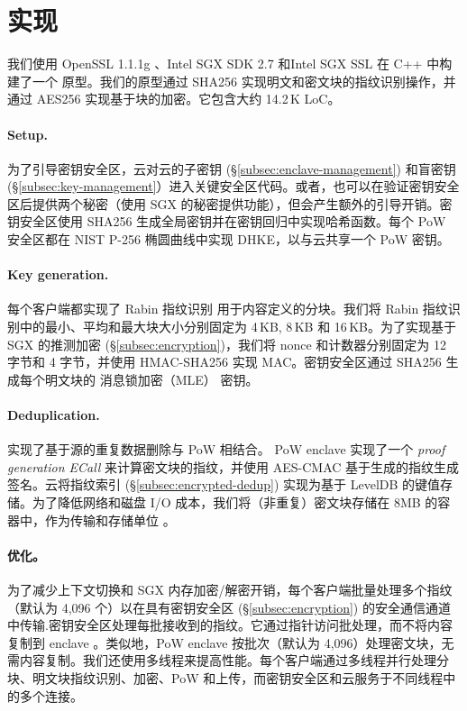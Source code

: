 \section{实现}
\label{sec:implementation}

我们使用 OpenSSL 1.1.1g \cite{openssl}、Intel SGX SDK 2.7 \cite{sgx} 和Intel SGX SSL \cite{sgxssl} 在 C++ 中构建了一个 \sysnameS 原型。我们的原型通过 SHA256 实现明文和密文块的指纹识别操作，并通过 AES256 实现基于块的加密。它包含大约 14.2\,K LoC。

\paragraph{Setup.} 
为了引导密钥安全区，云对云的子密钥 (\S\ref{subsec:enclave-management}) 和盲密钥 (\S\ref{subsec:key-management}）进入关键安全区代码。或者，\sysnameS 也可以在验证密钥安全区后提供两个秘密（使用 SGX \cite{sgx} 的秘密提供功能），但会产生额外的引导开销。密钥安全区使用 SHA256 生成全局密钥并在密钥回归中实现哈希函数。每个 PoW 安全区都在 NIST P-256 椭圆曲线中实现 DHKE，以与云共享一个 PoW 密钥。

\paragraph{Key generation.} 每个客户端都实现了 Rabin 指纹识别 \cite{rabin81} 用于内容定义的分块。我们将 Rabin 指纹识别中的最小、平均和最大块大小分别固定为 4\,KB, 8\,KB 和 16\,KB。为了实现基于 SGX 的推测加密 (\S\ref{subsec:encryption})，我们将 nonce 和计数器分别固定为 12 字节和 4 字节，并使用 HMAC-SHA256 实现 MAC。密钥安全区通过 SHA256 生成每个明文块的 消息锁加密（MLE） 密钥。

\paragraph{Deduplication.} \sysnameS 实现了基于源的重复数据删除与 PoW 相结合。 PoW enclave 实现了一个 \textit{ proof generation ECall} 来计算密文块的指纹，并使用 AES-CMAC 基于生成的指纹生成签名。云将指纹索引 (\S\ref{subsec:encrypted-dedup}) 实现为基于 LevelDB \cite{leveldb} 的键值存储。为了降低网络和磁盘 I/O 成本，我们将（非重复）密文块存储在 8MB 的容器中，作为传输和存储单位 \cite{lillibridge13}。

\paragraph{优化。} 为了减少上下文切换和 SGX 内存加密/解密开销，每个客户端批量处理多个指纹（默认为 4,096 个）以在具有密钥安全区 (\S\ref{subsec:encryption}) 的安全通信通道中传输.密钥安全区处理每批接收到的指纹。它通过指针访问批处理，而不将内容复制到 enclave \cite{harnik18}。类似地，PoW enclave 按批次（默认为 4,096）处理密文块，无需内容复制。我们还使用多线程来提高性能。每个客户端通过多线程并行处理分块、明文块指纹识别、加密、PoW 和上传，而密钥安全区和云服务于不同线程中的多个连接。